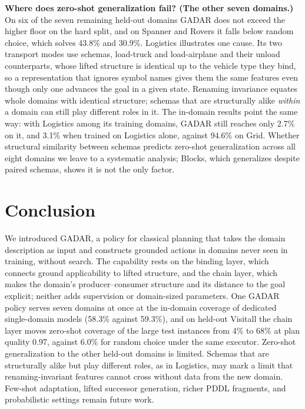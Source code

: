\documentclass{article} %
\newcommand{\gadar}{GADAR}                 %
\newcommand{\todonum}[1]{#1}
\begin{document}
\textbf{Where does zero-shot generalization fail? (The other seven domains.)} On
\todonum{six} of the seven remaining held-out domains \gadar{} does not
exceed the higher floor on the hard split, and on \todonum{Spanner and
Rovers} it falls below random choice, which solves 43.8\% and 30.9\%.
Logistics illustrates one cause.
Its two transport modes use schemas, \textsf{load-truck} and
\textsf{load-airplane} and their unload counterparts, whose lifted structure
is identical up to the vehicle type they bind, so a representation that
ignores symbol names gives them the same features even though only one
advances the goal in a given state. Renaming invariance equates whole
domains with identical structure; schemas that are structurally alike
\emph{within} a domain can still play different roles in it. The in-domain results point
the same way: with Logistics among its training domains, \gadar{} still
reaches only 2.7\% on it, and 3.1\% when trained on Logistics alone,
against 94.6\% on Grid. Whether
structural similarity between schemas predicts zero-shot generalization
across all eight domains we leave to a systematic analysis; Blocks, which
generalizes despite
paired schemas, shows it is not the only factor.

\section{Conclusion}

We introduced \gadar{}, a policy for classical planning that takes the
domain description as input and constructs grounded actions in domains
never seen in training, without search. The capability rests on the
binding layer, which connects ground applicability to lifted structure,
and the chain layer, which makes the domain's producer--consumer structure
and its distance to the goal explicit; neither adds supervision or
domain-sized parameters. One \gadar{} policy serves seven domains at once at
the in-domain coverage of dedicated single-domain models (58.3\% against
59.3\%), and on held-out Visitall the chain layer moves zero-shot coverage of the large
test instances from \todonum{4}\% to \todonum{68}\% at plan quality
\todonum{0.97}, against \todonum{6.0}\% for random choice under the same
executor. Zero-shot generalization to the other held-out domains is
limited. Schemas that are
structurally alike but play different roles, as in Logistics, may mark a
limit that renaming-invariant features cannot cross without data from the
new domain. Few-shot adaptation, lifted successor generation, richer PDDL
fragments, and probabilistic settings remain future work.
\end{document}
